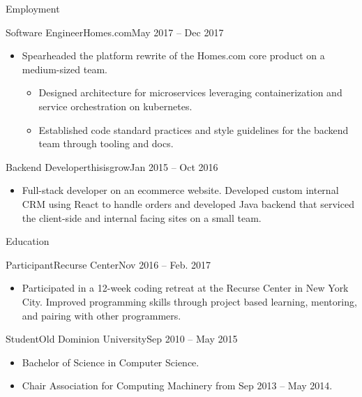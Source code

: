\documentclass[]{mcdowellcv}
\begin{document}
\begin{cvsection}{Employment}
        \begin{cvsubsection}{Software Engineer}{Homes.com}{May 2017 – Dec 2017}
            \begin{itemize}
                \item Spearheaded the platform rewrite of the Homes.com core product on a medium-sized team.
                \begin{itemize}
                    \item Designed architecture for microservices leveraging containerization and service orchestration on kubernetes. 
                    \item Established code standard practices and style guidelines for the backend team through tooling and docs.
                \end{itemize}
            \end{itemize}
        \end{cvsubsection}

        \begin{cvsubsection}{Backend Developer}{thisisgrow}{Jan 2015 – Oct 2016}
            \begin{itemize}
                \item Full-stack developer on an ecommerce website. Developed custom internal CRM using React to handle orders and developed Java backend that serviced the client-side and internal facing sites on a small team.
            \end{itemize}
        \end{cvsubsection}
    \end{cvsection}

    \begin{cvsection}{Education}
        \begin{cvsubsection}{Participant}{Recurse Center}{Nov 2016 – Feb. 2017}
            \begin{itemize}
                \item Participated in a 12-week coding retreat at the Recurse Center in New York City.\newline 
                Improved programming skills through project based learning, mentoring, and pairing with other programmers.
            \end{itemize}
        \end{cvsubsection}
        \begin{cvsubsection}{Student}{Old Dominion University}{Sep 2010 – May 2015}
            \begin{itemize}
                \item Bachelor of Science in Computer Science.
                \item Chair Association for Computing Machinery from Sep 2013 – May 2014.
            \end{itemize}
        \end{cvsubsection}
    \end{cvsection}
\end{document}
